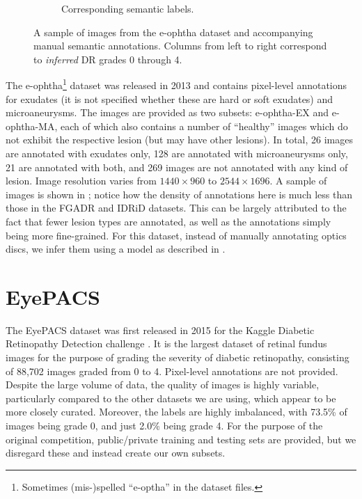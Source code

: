 \begin{figure}[h]
\begin{subfigure}{0.45\textwidth}
        \caption{Corresponding semantic labels.}
        \label{fig:eophtha_sample_label}
    \end{subfigure}
        \caption{A sample of images from the e-ophtha dataset and accompanying manual semantic annotations. Columns from left to right correspond to \emph{inferred} DR grades 0 through 4.}
    \label{fig:eophtha_sample}
\end{figure}

The e-ophtha\footnote{Sometimes (mis-)spelled ``e-optha'' in the dataset files.} \cite{eoptha} dataset was released in 2013 and contains pixel-level annotations for exudates (it is not specified whether these are hard or soft exudates) and microaneurysms.
The images are provided as two subsets: e-ophtha-EX and e-ophtha-MA, each of which also contains a number of ``healthy'' images which do not exhibit the respective lesion (but may have other lesions).
In total, 26 images are annotated with exudates only, 128 are annotated with microaneurysms only, 21 are annotated with both, and 269 images are not annotated with any kind of lesion.
Image resolution varies from $1440 \times 960$ to $2544 \times 1696$.
A sample of images is shown in ; notice how the density of annotations here is much less than those in the FGADR and IDRiD datasets.
This can be largely attributed to the fact that fewer lesion types are annotated, as well as the annotations simply being more fine-grained.
For this dataset, instead of manually annotating optics discs, we infer them using a model as described in .

\section{EyePACS}

The EyePACS dataset was first released in 2015 for the Kaggle Diabetic Retinopathy Detection challenge \cite{eyepacs}. 
It is the largest dataset of retinal fundus images for the purpose of grading the severity of diabetic retinopathy, consisting of 88,702 images graded from 0 to 4.
Pixel-level annotations are not provided.
Despite the large volume of data, the quality of images is highly variable, particularly compared to the other datasets we are using, which appear to be more closely curated.
Moreover, the labels are highly imbalanced, with 73.5\% of images being grade 0, and just 2.0\% being grade 4.
For the purpose of the original competition, public/private training and testing sets are provided, but we disregard these and instead create our own subsets.

